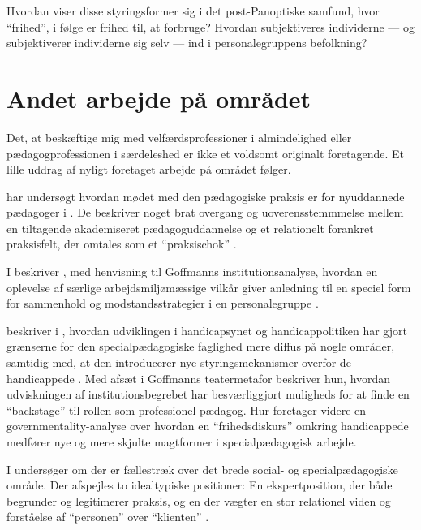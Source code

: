 Hvordan viser disse styringsformer sig i det post-Panoptiske samfund, hvor “frihed”, i følge \citeauthor{baumanLiquidModernity2000} er frihed til, at forbruge?
Hvordan subjektiveres individerne — og subjektiverer individerne sig selv — ind i personalegruppens befolkning? 

\section{Andet arbejde på området}
Det, at beskæftige mig med velfærdsprofessioner i almindelighed eller pædagogprofessionen i særdeleshed er ikke et voldsomt originalt foretagende.
Et lille uddrag af nyligt foretaget arbejde på området følger.

\citeauthor{nielsenAttraktivPaPapiret2017} har undersøgt hvordan mødet med den pædagogiske praksis er for nyuddannede pædagoger i .
De beskriver noget brat overgang og uoverensstemmmelse mellem en tiltagende akademiseret pædagoguddannelse og et relationelt forankret praksisfelt, der omtales som et “praksischok” \autocite{nielsenAttraktivPaPapiret2017}.

I  beskriver \citeauthor{dreyerespersenBekymrendeIdentiteterAnbragte2010}, med henvisning til Goffmanns institutionsanalyse, hvordan en oplevelse af særlige arbejdsmiljømæssige vilkår giver anledning til en speciel form for sammenhold og modstandsstrategier i en personalegruppe \autocite{dreyerespersenBekymrendeIdentiteterAnbragte2010}.

\citeauthor{hurFrigorelsensMagt2015} beskriver i , hvordan udviklingen i handicapsynet og handicappolitiken har gjort grænserne for den specialpædagogiske faglighed mere diffus på nogle områder, samtidig med, at den introducerer nye styringsmekanismer overfor de handicappede \autocite{hurFrigorelsensMagt2015}.
Med afsæt i Goffmanns teatermetafor beskriver hun, hvordan udviskningen af institutionsbegrebet har besværliggjort muligheds for at finde en “backstage” til rollen som professionel pædagog.
Hur foretager videre en governmentality-analyse over hvordan en “frihedsdiskurs” omkring handicappede medfører nye og mere skjulte magtformer i specialpædagogisk arbejde.

I  undersøger \citeauthor{meyer-johansenFagligeOrienteringerSocialspecialpaedagogisk2018} om der er fællestræk over det brede social- og specialpædagogiske område.
Der afspejles to idealtypiske positioner: En ekspertposition, der både begrunder og legitimerer praksis, og en der vægter en stor relationel viden og forståelse af “personen” over “klienten” \autocite{meyer-johansenFagligeOrienteringerSocialspecialpaedagogisk2018}.


